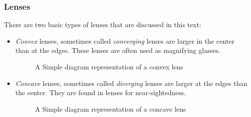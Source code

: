 		\subsubsection{Lenses} 
		
		


There are two basic types of lenses that are discussed in this text: 
\begin{itemize}
	\item \textit{Convex} lenses, sometimes called \textit{converging} lenses are larger in the center than at the edges.  These lenses are often used as magnifying glasses.  	

	\begin{figure} [H]

		\begin{center}
				\caption{A Simple diagram representation of a convex lens}
	\end{center}
	\end{figure}



\item \textit{Concave} lenses, sometimes called \textit{diverging} lenses are larger at the edges than the center.  They are found in lenses for near-sightedness.  

\begin{center}
	\begin{figure}[H]
		\begin{center}

				\caption{A Simple diagram representation of a concave lens}
				\end{center}
	\end{figure}
\end{center}

\end{itemize}


